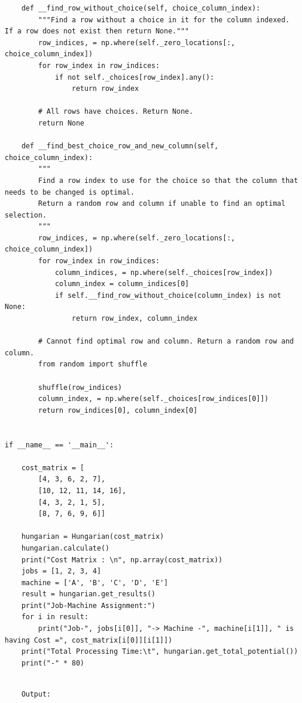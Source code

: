\documentclass[12pt, letterpaper, twoside]{book}
\begin{document}
\begin{lstlisting}
    def __find_row_without_choice(self, choice_column_index):
        """Find a row without a choice in it for the column indexed. If a row does not exist then return None."""
        row_indices, = np.where(self._zero_locations[:, choice_column_index])
        for row_index in row_indices:
            if not self._choices[row_index].any():
                return row_index

        # All rows have choices. Return None.
        return None

    def __find_best_choice_row_and_new_column(self, choice_column_index):
        """
        Find a row index to use for the choice so that the column that needs to be changed is optimal.
        Return a random row and column if unable to find an optimal selection.
        """
        row_indices, = np.where(self._zero_locations[:, choice_column_index])
        for row_index in row_indices:
            column_indices, = np.where(self._choices[row_index])
            column_index = column_indices[0]
            if self.__find_row_without_choice(column_index) is not None:
                return row_index, column_index

        # Cannot find optimal row and column. Return a random row and column.
        from random import shuffle

        shuffle(row_indices)
        column_index, = np.where(self._choices[row_indices[0]])
        return row_indices[0], column_index[0]


if __name__ == '__main__':

    cost_matrix = [
        [4, 3, 6, 2, 7],
        [10, 12, 11, 14, 16],
        [4, 3, 2, 1, 5],
        [8, 7, 6, 9, 6]]

    hungarian = Hungarian(cost_matrix)
    hungarian.calculate()
    print("Cost Matrix : \n", np.array(cost_matrix))
    jobs = [1, 2, 3, 4]
    machine = ['A', 'B', 'C', 'D', 'E']
    result = hungarian.get_results()
    print("Job-Machine Assignment:")
    for i in result:
        print("Job-", jobs[i[0]], "-> Machine -", machine[i[1]], " is having Cost =", cost_matrix[i[0]][i[1]])
    print("Total Processing Time:\t", hungarian.get_total_potential())
    print("-" * 80)

\end{lstlisting}
\pagebreak
\begin{lstlisting}

	Output:

\end{lstlisting}
\end{document}

